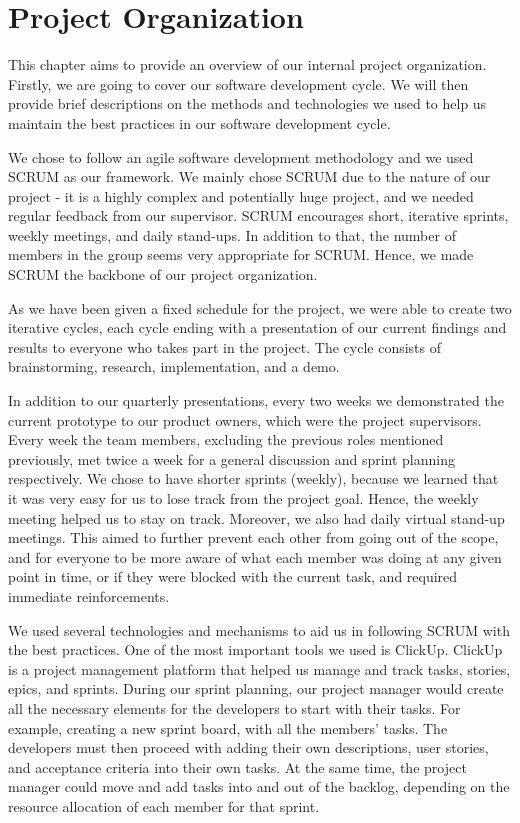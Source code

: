 \section{Project Organization}

This chapter aims to provide an overview of our internal project organization. Firstly, we are going to cover our software development cycle. We will then provide brief descriptions on the methods and technologies we used to help us maintain the best practices in our software development cycle.

We chose to follow an agile software development methodology and we used SCRUM as our framework. We mainly chose SCRUM due to the nature of our project - it is a highly complex and potentially huge project, and we needed regular feedback from our supervisor. SCRUM encourages short, iterative sprints, weekly meetings, and daily stand-ups. In addition to that, the number of members in the group seems very appropriate for SCRUM. Hence, we made SCRUM the backbone of our project organization.

As we have been given a fixed schedule for the project, we were able to create two iterative cycles, each cycle ending with a presentation of our current findings and results to everyone who takes part in the project. The cycle consists of brainstorming, research, implementation, and a demo.

In addition to our quarterly presentations, every two weeks we demonstrated the current prototype to our product owners, which were the project supervisors. Every week the team members, excluding the previous roles mentioned previously, met twice a week for a general discussion and sprint planning respectively. We chose to have shorter sprints (weekly), because we learned that it was very easy for us to lose track from the project goal. Hence, the weekly meeting helped us to stay on track. Moreover, we also had daily virtual stand-up meetings. This aimed to further prevent each other from going out of the scope, and for everyone to be more aware of what each member was doing at any given point in time, or if they were blocked with the current task, and required immediate reinforcements.

We used several technologies and mechanisms to aid us in following SCRUM with the best practices. One of the most important tools we used is ClickUp. ClickUp is a project management platform that helped us manage and track tasks, stories, epics, and sprints. During our sprint planning, our project manager would create all the necessary elements for the developers to start with their tasks. For example, creating a new sprint board, with all the members' tasks. The developers must then proceed with adding their own descriptions, user stories, and acceptance criteria into their own tasks. At the same time, the project manager could move and add tasks into and out of the backlog, depending on the resource allocation of each member for that sprint.

